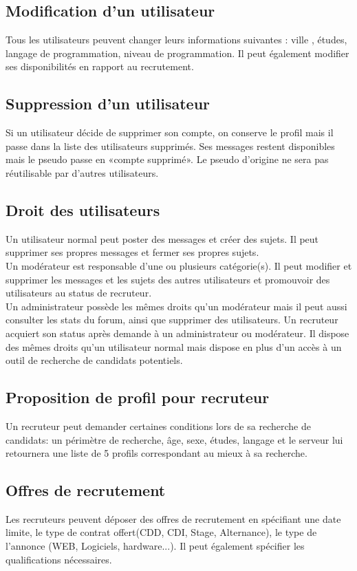 \documentclass{report}
\begin{document}
\subsection{Modification d’un utilisateur}
		Tous les utilisateurs peuvent changer leurs informations 	suivantes : ville , études, langage de programmation, niveau 	de programmation. Il peut également modifier ses disponibilités en rapport au recrutement.

\subsection{Suppression d’un utilisateur}
		Si un utilisateur décide de supprimer son compte, on 	conserve le profil mais il passe dans la liste des 	utilisateurs 	supprimés. Ses messages restent disponibles mais le 	pseudo 	passe en «compte supprimé». Le pseudo d'origine ne 	sera pas 	réutilisable par d'autres utilisateurs.
\subsection{Droit des utilisateurs}
		Un utilisateur normal peut poster des messages et    	créer des sujets. Il peut supprimer ses propres messages et 	fermer ses propres sujets.\\
		Un modérateur est responsable d’une ou plusieurs 	catégorie(s). Il peut modifier et supprimer les 			messages et les sujets des autres utilisateurs et 			promouvoir des utilisateurs au status de recruteur.\\
		Un administrateur possède les mêmes droits qu'un 	modérateur mais il peut aussi consulter les stats du 		forum, ainsi que supprimer des utilisateurs.
		Un recruteur acquiert son status après demande à un 	administrateur ou modérateur. Il dispose des mêmes 	droits 	qu'un utilisateur normal mais dispose en plus d'un accès à un 	outil de recherche de candidats potentiels.\\

\subsection{Proposition de profil pour recruteur}
		Un recruteur peut demander certaines conditions 	lors de sa recherche de candidats: un périmètre de 		recherche, âge, sexe, études, langage et le serveur lui 	retournera une liste de 5 profils correspondant au mieux à sa 	recherche.\\
	\pagebreak	
\subsection{Offres de recrutement}
Les recruteurs peuvent déposer des offres de recrutement en spécifiant une date limite, le type de contrat offert(CDD, CDI, Stage, Alternance), le type de l'annonce (WEB, Logiciels, hardware...). Il peut également spécifier les qualifications nécessaires.\\
\end{document}
